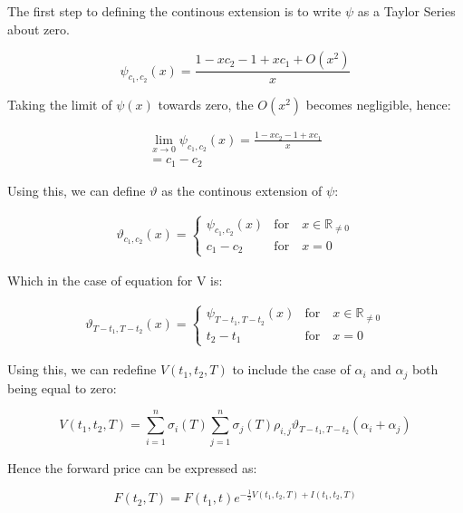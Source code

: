 \documentclass{article}
\begin{document}
The first step to defining the continous extension is to write $\psi$ as a Taylor Series
about zero.

\begin{equation}
    \psi_{c_1, c_2}(x) = \frac{1 - x c_2 - 1 + x c_1 + O(x^2)}{x}
\end{equation}

Taking the limit of $\psi(x)$ towards zero, the $O(x^2)$ becomes negligible, hence:

\begin{eqnarray}
    \nonumber
    \lim_{x \to 0} \psi_{c_1, c_2}(x) = \frac{1 - x c_2 - 1 + x c_1}{x} \\
    = c_1 - c_2
\end{eqnarray}

Using this, we can define $\vartheta$ as the continous extension of $\psi$:

\begin{align}
    \vartheta_{c_1, c_2}(x) = 
    \begin{cases}
        \psi_{c_1, c_2}(x) & \text{for} \quad x \in \mathbb{R}_{\ne 0} \\
        c_1 - c_2 & \text{for} \quad x=0
    \end{cases}
\end{align}

Which in the case of equation for V is:

\begin{align}
    \vartheta_{T-t_1, T-t_2}(x) = 
    \begin{cases}
        \psi_{T-t_1, T-t_2}(x) & \text{for} \quad x \in \mathbb{R}_{\ne 0} \\
        t_2 - t_1 & \text{for} \quad x=0
    \end{cases}
\end{align}


\bigskip

Using this, we can redefine $V(t_1, t_2, T)$ to include the case of $\alpha_i$ and
$\alpha_j$ both being equal to zero:

\begin{equation}
    \nonumber
    V(t_1, t_2, T) = \sum_{i=1}^n \sigma_i(T) \sum_{j=1}^n \sigma_j(T) \rho_{i,j} 
    \vartheta_{T-t_1, T-t_2}(\alpha_i + \alpha_j)
\end{equation}

Hence the forward price can be expressed as:


\begin{equation}
    F(t_2, T) = F(t_1, t)e^{- \frac{1}{2} V(t_1, t_2, T) + I(t_1, t_2, T)}
\end{equation}
\end{document}
